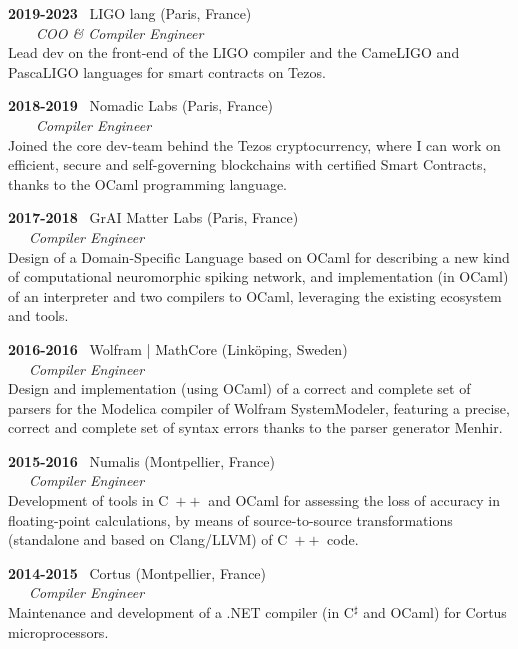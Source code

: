 \documentclass[a4paper,11pt]{article}
\newcommand{\cpp}{\mbox{C \hspace*{-2.5mm} \raise 0.7mm \hbox{${\scriptscriptstyle ++}$}}}
\begin{document}
\bigskip

\noindent\textbf{2019-2023} \ \textsf{LIGO lang} (Paris,
France)\\ \ \ \ \ \emph{COO \& Compiler Engineer}\\ Lead dev on the
front-end of the LIGO compiler and the CameLIGO and PascaLIGO
languages for smart contracts on Tezos.

\bigskip

\noindent\textbf{2018-2019} \ \textsf{Nomadic Labs} (Paris,
  France)\\ \ \ \ \ \emph{Compiler Engineer}\\ Joined the core
  dev-team behind the Tezos cryptocurrency, where I can work on
  efficient, secure and self-governing blockchains with certified
  Smart Contracts, thanks to the OCaml programming language.

\bigskip

\noindent\textbf{2017-2018} \ \textsf{GrAI Matter Labs} (Paris,
France)\\ \ \ \ \emph{Compiler Engineer}\\ Design of a Domain-Specific
Language based on OCaml for describing a new kind of computational
neuromorphic spiking network, and implementation (in OCaml) of an
interpreter and two compilers to OCaml, leveraging the existing
ecosystem and tools.

\newpage

\noindent\textbf{2016-2016} \ \textsf{Wolfram | MathCore}
(Link\"oping, Sweden)\\ \ \ \ \emph{Compiler Engineer}\\ Design and
implementation (using OCaml) of a correct and complete set of parsers
for the Modelica compiler of Wolfram SystemModeler, featuring a
precise, correct and complete set of syntax errors thanks to the
parser generator Menhir.

\bigskip

\noindent\textbf{2015-2016} \ \textsf{Numalis} (Montpellier,
France)\\ \ \ \ \emph{Compiler Engineer}\\ Development of tools in
\cpp{} and OCaml for assessing the loss of accuracy in floating-point
calculations, by means of source-to-source transformations (standalone
and based on Clang/LLVM) of \cpp{} code.

\bigskip

\noindent\textbf{2014-2015} \ \textsf{Cortus} (Montpellier,
France)\\ \ \ \ \emph{Compiler Engineer}\\ Maintenance and development
of a .NET compiler (in C$^\sharp$ and OCaml) for \textsf{Cortus}
microprocessors.
\end{document}
